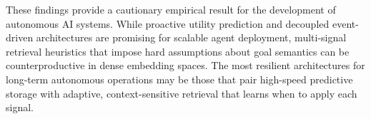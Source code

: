 \documentclass[conference]{IEEEtran}
\begin{document}
These findings provide a cautionary empirical result for the development of autonomous AI systems. While proactive utility prediction and decoupled event-driven architectures are promising for scalable agent deployment, multi-signal retrieval heuristics that impose hard assumptions about goal semantics can be counterproductive in dense embedding spaces. The most resilient architectures for long-term autonomous operations may be those that pair high-speed predictive storage with adaptive, context-sensitive retrieval that learns when to apply each signal.





\end{document}
